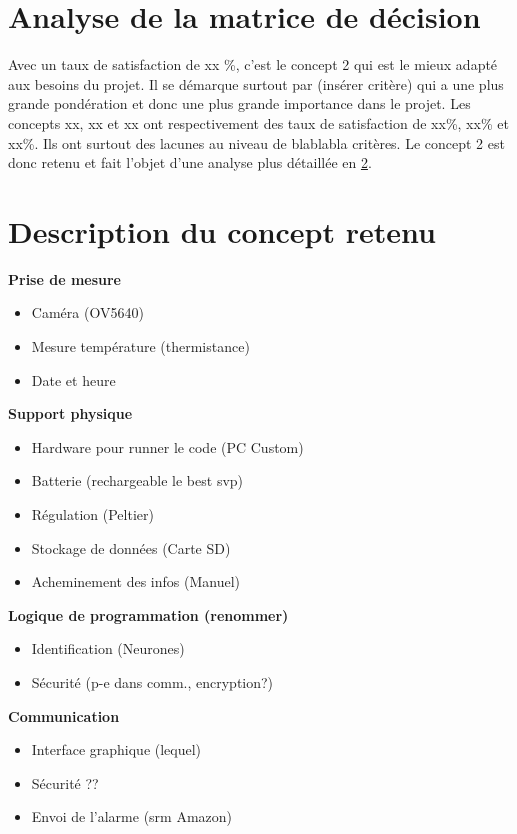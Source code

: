 \section{Analyse de la matrice de décision}

Avec un taux de satisfaction de xx \%, c'est le concept 2 qui est le mieux adapté aux besoins du projet. Il se démarque surtout par (insérer critère) qui a une plus grande pondération et donc une plus grande importance dans le projet. Les concepts xx, xx et xx ont respectivement des taux de satisfaction de xx\%, xx\% et xx\%. Ils ont surtout des lacunes au niveau de blablabla critères. Le concept 2 est donc retenu et fait l'objet d'une analyse plus détaillée en \ref{ch7:concept_retenu}.

\section{Description du concept retenu}
\label{ch7:concept_retenu}

\textbf{Prise de mesure}
\begin{itemize}
    \item Caméra (OV5640)
    \item Mesure température (thermistance)
    \item Date et heure
\end{itemize}

\textbf{Support physique}
\begin{itemize}
    \item Hardware pour runner le code (PC Custom)
    \item Batterie (rechargeable le best svp)
    \item Régulation (Peltier)
    \item Stockage de données (Carte SD)
    \item Acheminement des infos (Manuel)
\end{itemize}

\textbf{Logique de programmation (renommer)}
\begin{itemize}
    \item Identification (Neurones)
    \item Sécurité (p-e dans comm., encryption?)
\end{itemize}

\textbf{Communication}
\begin{itemize}
    \item Interface graphique (lequel)
    \item Sécurité ??
    \item Envoi de l'alarme (srm Amazon)
\end{itemize}

